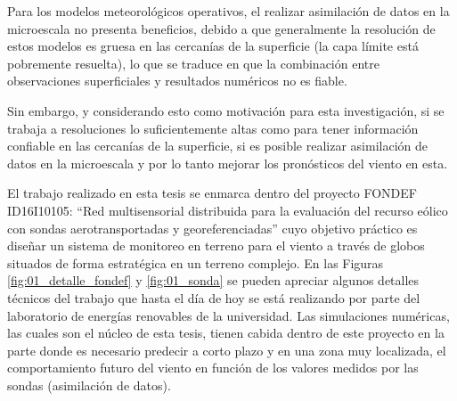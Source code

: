 Para los modelos meteorológicos operativos, el realizar asimilación de datos en la microescala no presenta beneficios, debido a que generalmente la resolución de estos modelos es gruesa en las cercanías de la superficie (la capa límite está pobremente resuelta), lo que se traduce en que la combinación entre observaciones superficiales y resultados numéricos no es fiable.

Sin embargo, y considerando esto como motivación para esta investigación, si se trabaja a resoluciones lo suficientemente altas como para tener información confiable en las cercanías de la superficie, si es posible realizar asimilación de datos en la microescala y por lo tanto mejorar los pronósticos del viento en esta.

El trabajo realizado en esta tesis se enmarca dentro del proyecto FONDEF ID16I10105: ``Red multisensorial distribuida para la evaluación del recurso eólico con sondas aerotransportadas y georeferenciadas'' cuyo objetivo práctico es diseñar un sistema de monitoreo en terreno para el viento a través de globos situados de forma estratégica en un terreno complejo. En las Figuras \ref{fig:01_detalle_fondef} y \ref{fig:01_sonda} se pueden apreciar algunos detalles técnicos del trabajo que hasta el día de hoy se está realizando por parte del laboratorio de energías renovables de la universidad. Las simulaciones numéricas, las cuales son el núcleo de esta tesis, tienen cabida dentro de este proyecto en la parte donde es necesario predecir a corto plazo y en una zona muy localizada, el comportamiento futuro del viento en función de los valores medidos por las sondas (asimilación de datos).

